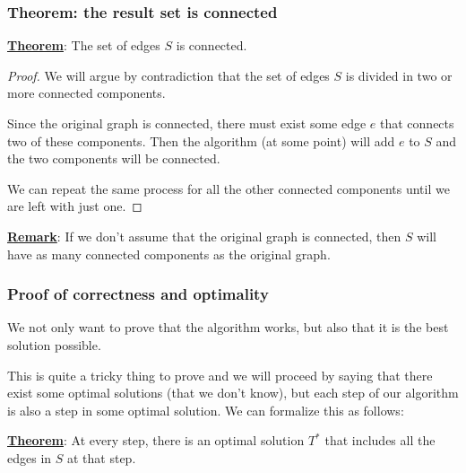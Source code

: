 \documentclass[12pt]{extarticle}
\begin{document}
\subsubsection{Theorem: the result set is connected}

\textbf{\underline{Theorem}}: The set of edges $S$ is connected.

\begin{proof}
    We will argue by contradiction that the set of edges $S$ is divided in two or more connected components.

    Since the original graph is connected, there must exist some edge $e$ that connects two of these components.
    Then the algorithm (at some point) will add $e$ to $S$ and the two components will be connected.

    We can repeat the same process for all the other connected components until we are left with just one.
\end{proof}

\textbf{\underline{Remark}}: If we don't assume that the original graph is connected, then $S$ will have as many connected components as the original graph.

\subsubsection{Proof of correctness and optimality}

We not only want to prove that the algorithm works, but also that it is the best solution possible.

This is quite a tricky thing to prove and we will proceed by saying that there exist some optimal solutions (that we don't know), but each step of our algorithm is also a step in some optimal solution. We can formalize this as follows:

\textbf{\underline{Theorem}}: At every step, there is an optimal solution $T^*$ that includes all the edges in $S$ at that step.
\end{document}
